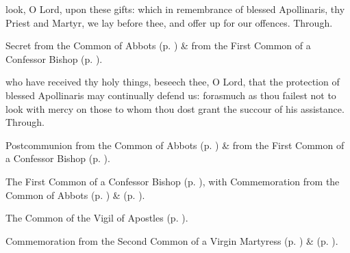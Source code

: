 
\secret
{} look, O Lord, upon these gifts: which in remembrance of blessed Apollinaris, thy Priest and Martyr, we lay before thee, and offer up for our offences. Through.

\begin{rubric}
	 Secret  from the Common of Abbots (p. \pageref{CommonAbbotsSecret}) \&   from the First Common of a Confessor Bishop (p. \pageref{CommonConfessorBishopISecret}).
\end{rubric}


\postcommunion
{} who have received thy holy things, beseech thee, O Lord, that the protection of blessed Apollinaris may continually defend us: forasmuch as thou failest not to look with mercy on those to whom thou dost grant the succour of his assistance. Through.

\begin{rubric}
	 Postcommunion  from the Common of Abbots (p. \pageref{CommonAbbotsPostcommunion}) \&   from the First Common of a Confessor Bishop (p. \pageref{CommonConfessorBishopIPostcommunion}).
\end{rubric}



\begin{rubric}
	The First Common of a Confessor Bishop (p. \pageref{CommonConfessorBishopI}), with Commemoration  from the Common of Abbots (p. \pageref{CommonAbbots}) \&  (p. \pageref{ApollinarisRavenna}).
\end{rubric}


\clearpage
{}

\begin{rubric}
	The Common of the Vigil of Apostles (p. \pageref{CommonVigilApostles}).
\end{rubric}
\begin{rubric}
	Commemoration  from the Second Common of a Virgin Martyress (p. \pageref{CommonVirginMartyrII}) \&  (p. \pageref{SPSaints}).
\end{rubric}


